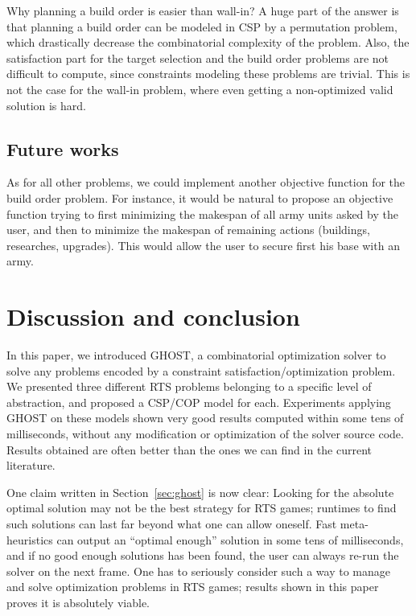 \documentclass{article}
\newcommand{\csp}{\textsc{CSP}\xspace}
\newcommand{\cop}{\textsc{COP}\xspace}
\newcommand{\ghost}{\textsc{GHOST}\xspace}
\begin{document}
Why planning a build order is easier  than wall-in? A huge part of the
answer is  that planning  a build order  can be modeled  in \csp  by a
permutation  problem,  which  drastically decrease  the  combinatorial
complexity of the problem. Also,  the satisfaction part for the target
selection and the  build order problems are not  difficult to compute,
since constraints  modeling these problems  are trivial.  This  is not
the case for  the wall-in problem, where even  getting a non-optimized
valid solution is hard.

\subsection{Future works}

As  for  all other  problems,  we  could implement  another  objective
function  for the  build  order  problem. For  instance,  it would  be
natural to  propose an objective  function trying to  first minimizing
the makespan of all army units asked by the user, and then to minimize
the   makespan   of    remaining   actions   (buildings,   researches,
upgrades). This would allow the user  to secure first his base with an
army.


\section{Discussion and conclusion}\label{sec:conclusion}

In  this paper,  we  introduced \ghost,  a combinatorial  optimization
solver   to    solve   any   problems   encoded    by   a   constraint
satisfaction/optimization problem.   We presented three  different RTS
problems belonging to a specific  level of abstraction, and proposed a
\csp/\cop model for each. Experiments  applying \ghost on these models
shown very  good results  computed within  some tens  of milliseconds,
without  any  modification  or   optimization  of  the  solver  source
code. Results obtained  are often better than the ones  we can find in
the current literature.

One claim written in Section~\ref{sec:ghost} is now clear: Looking for
the absolute  optimal solution may  not be  the best strategy  for RTS
games; runtimes  to find such solutions  can last far beyond  what one
can  allow  oneself.  Fast  meta-heuristics  can  output an  ``optimal
enough'' solution in some tens of  milliseconds, and if no good enough
solutions has been found, the user can always re-run the solver on the
next frame.   One has to seriously  consider such a way  to manage and
solve optimization problems in RTS  games; results shown in this paper
proves it is absolutely viable.
\end{document}
